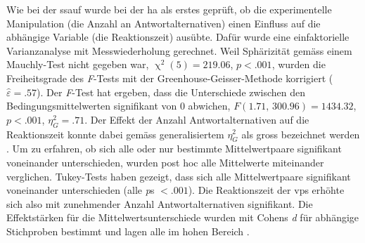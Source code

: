 \documentclass[11pt, twoside, a4paper]{book}		%
\begin{document}
Wie bei der \gls{ssauf} wurde bei der \gls{ha} als erstes geprüft, ob die experimentelle Manipulation (die Anzahl an Antwortalternativen) einen Einfluss auf die abhängige Variable (die Reaktionszeit) ausübte. Dafür wurde 
eine einfaktorielle Varianzanalyse mit Messwiederholung gerechnet.
Weil Sphärizität gemäss einem Mauchly-Test nicht gegeben war, $\upchi^2(5)=219.06$, $p<.001$, wurden die Freiheitsgrade des \textit{F}-Tests mit der Greenhouse-Geisser-Methode korrigiert ($\hat{\varepsilon}=.57$). Der \textit{F}-Test hat ergeben, dass die Unterschiede zwischen den Bedingungsmittelwerten signifikant von 0 abwichen, $F(1.71,\,300.96)=1434.32$, $p<.001$, $\eta_{G}^2=.71$. Der Effekt der Anzahl Antwortalternativen auf die Reaktionszeit konnte dabei gemäss generalisiertem $\eta_{G}^2$ \citep{Olejnik2003} als gross bezeichnet werden \citep[S. 383]{Bakeman2005}.
Um zu erfahren, ob sich alle oder nur bestimmte Mittelwertpaare signifikant voneinander unterschieden, wurden post hoc alle Mittelwerte miteinander verglichen.
Tukey-Tests haben gezeigt, dass sich alle Mittelwertpaare signifikant voneinander unterschieden (alle \textit{p}s $<.001$).
Die Reaktionszeit der \glspl{vp} erhöhte sich also mit zunehmender Anzahl Antwortalternativen signifikant.
Die Effektstärken für die Mittelwertsunterschiede wurden mit Cohens \textit{d} für abhängige Stichproben \citep{Gibbons1993} bestimmt und lagen alle im hohen Bereich \citep[][S. 40; siehe \autoref{tab:effect_sizes_hick}]{Cohen1988}.
\end{document}
